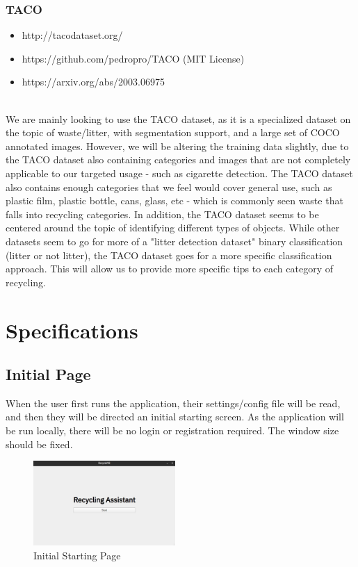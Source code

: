 \documentclass[conference]{IEEEtran}
\begin{document}
\subsubsection{TACO}
\begin{itemize}
\item http://tacodataset.org/
\item https://github.com/pedropro/TACO (MIT License)
\item https://arxiv.org/abs/2003.06975
\end{itemize}~\\
We are mainly looking to use the TACO dataset, as it is a specialized dataset on the topic of waste/litter, with segmentation support, and a large set of COCO annotated images. \newline
However, we will be altering the training data slightly, due to the TACO dataset also containing categories and images that are not completely applicable to our targeted usage - such as cigarette detection.
\newline\newline
The TACO dataset also contains enough categories that we feel would cover general use, such as plastic film, plastic bottle, cans, glass, etc - which is commonly seen waste that falls into recycling categories.
\newline
In addition, the TACO dataset seems to be centered around the topic of identifying different types of objects. While other datasets seem to go for more of a "litter detection dataset" binary classification (litter or not litter), the TACO dataset goes for a more specific classification approach. This will allow us to provide more specific tips to each category of recycling.

\section{Specifications}
\subsection{Initial Page}
When the user first runs the application, their settings/config file will be read, and then they will be directed an initial starting screen. As the application will be run locally, there will be no login or registration required. The window size should be fixed. ~\\

\begin{figure}[h]
    \centering
    \includegraphics[width=0.48\textwidth]{images/start.eps}
    \caption{Initial Starting Page}
\end{figure}~\\
\end{document}
